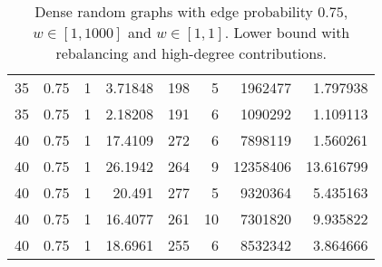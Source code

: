 \documentclass[a4paper,11pt]{article}
\begin{document}
\begin{table}
\begin{center}
\begin{tabular}{|rrr|r|r|rr|r|}
35 & 0.75 & 1 & 3.71848 & 198 & 5 & 1962477 & 1.797938 \\
35 & 0.75 & 1 & 2.18208 & 191 & 6 & 1090292 & 1.109113 \\
40 & 0.75 & 1 & 17.4109 & 272 & 6 & 7898119 & 1.560261 \\
40 & 0.75 & 1 & 26.1942 & 264 & 9 & 12358406 & 13.616799 \\
40 & 0.75 & 1 & 20.491 & 277 & 5 & 9320364 & 5.435163 \\
40 & 0.75 & 1 & 16.4077 & 261 & 10 & 7301820 & 9.935822 \\
40 & 0.75 & 1 & 18.6961 & 255 & 6 & 8532342 & 3.864666 \\
\hline
\end{tabular}
\end{center}
\caption{Dense random graphs with edge probability $0.75$,
  $w\in[1,1000]$ and $w\in[1,1]$. Lower bound with rebalancing and
  high-degree contributions.}
\label{tab:dense-highdegree}
\end{table}
\end{document}
